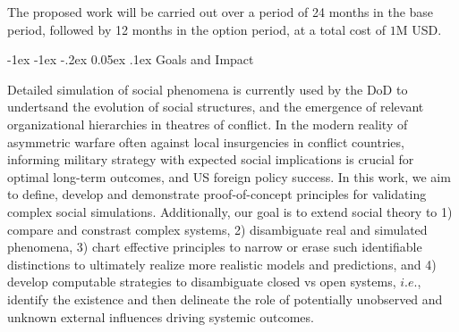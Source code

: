 \documentclass[onecolumn, compsoc,11pt]{IEEEtran}
\makeatletter
\renewcommand\section{\@startsection {section}{1}{\z@}%
  {-1ex \@plus -1ex \@minus -.2ex}%
  {0.05ex \@plus.1ex}%
  {\large\bfseries\scshape}}
\makeatother
\begin{document}
The proposed work will be carried out over a period of 24 months in the base period, followed by 12 months in the option period, at a total cost of $1$M USD. 

\section{Goals and Impact}



Detailed simulation of social phenomena is currently used by the DoD to undertsand the evolution  of social structures, and the emergence of relevant  organizational hierarchies  in theatres of conflict. In the modern reality of asymmetric warfare often against local insurgencies in conflict countries, informing military strategy with expected social implications is crucial for optimal long-term outcomes, and US  foreign policy success.
In this work, we aim to define, develop and demonstrate proof-of-concept principles for validating  complex social simulations. Additionally, our goal is to  extend social theory to 1)  compare and constrast complex systems, 2)  disambiguate real and simulated phenomena,   3) chart effective principles to narrow or erase such identifiable distinctions to ultimately realize more realistic models and predictions, and 4) develop computable strategies  to disambiguate closed vs open systems, $i.e.$, identify the existence and then delineate the role of potentially unobserved and unknown  external influences driving 
systemic outcomes.
\end{document}
